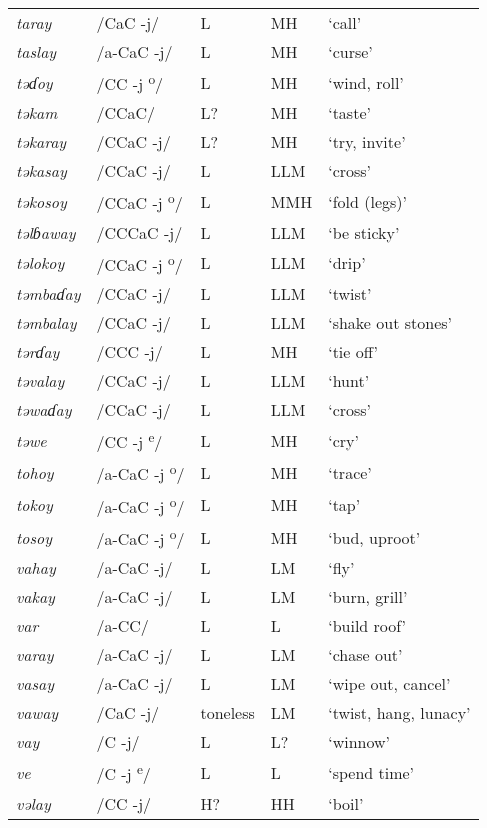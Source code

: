 \begin{small}
\begin{longtable}{lp{1.75cm}p{1.75cm}p{1.75cm}p{3cm}}
\textit{taray} & /CaC -j/ & L & MH & ‘call’\\
\textit{taslay} & /a-CaC -j/ & L & MH & ‘curse’\\
\textit{təɗoy} & /CC -j\textsuperscript{ o}/ & L & MH & ‘wind, roll’\\
\textit{təkam} & /CCaC/ & L? & MH & ‘taste’\\
\textit{təkaray} & /CCaC -j/ & L? & MH & ‘try, invite’\\
\textit{təkasay} & /CCaC -j/ & L & LLM & ‘cross’\\
\textit{təkosoy} & /CCaC -j\textsuperscript{ o}/ & L & MMH & ‘fold (legs)’\\
\textit{təlɓaway} & /CCCaC -j/ & L & LLM & ‘be sticky’\\
\textit{təlok}\textit{oy} & /CCaC -j\textsuperscript{ o}/ & L & LLM & ‘drip’\\
\textit{təmbaɗay} & /CCaC -j/ & L & LLM & ‘twist’\\
\textit{təmbalay} & /CCaC -j/ & L & LLM & ‘shake out stones’\\
\textit{tərɗay} & /CCC -j/ & L & MH & ‘tie off’\\
\textit{təvalay} & /CCaC -j/ & L & LLM & ‘hunt’\\
\textit{təwaɗay} & /CCaC -j/ & L & LLM & ‘cross’\\
\textit{təwe} & /CC -j \textsuperscript{e}/ & L & MH & ‘cry’\\
\textit{tohoy} & /a-CaC -j\textsuperscript{ o}/ & L & MH & ‘trace’\\
\textit{tokoy} & /a-CaC -j\textsuperscript{ o}/ & L & MH & ‘tap’\\
\textit{tosoy} & /a-CaC -j\textsuperscript{ o}/ & L & MH & ‘bud, uproot’\\
\textit{vahay} & /a-CaC -j/ & L & LM & ‘fly’\\
\textit{vakay} & /a-CaC -j/ & L & LM & ‘burn, grill’\\
\textit{var} & /a-CC/ & L & L & ‘build roof’\\
\textit{varay} & /a-CaC -j/ & L & LM & ‘chase out’\\
\textit{vasay} & /a-CaC -j/ & L & LM & ‘wipe out, cancel’\\
\textit{vaway} & /CaC -j/ & toneless & LM & ‘twist, hang, lunacy’\\
\textit{vay} & /C -j/ & L & L? & ‘winnow’\\
\textit{ve} & /C -j \textsuperscript{e}/ & L & L & ‘spend time’\\
\textit{vəlay} & /CC -j/ & H? & HH & ‘boil’\\

\end{longtable}
\end{small}
